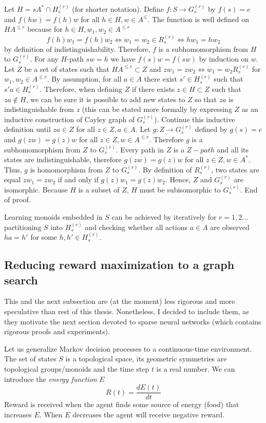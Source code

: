 \documentclass[12pt]{article}
\begin{document}
Let $H=sA^*\cap H_{s}^{(r)}$ (for shorter notation).
Define $f:S\rightarrow G_{s}^{(r)}$ by $f(s)=e$ and $f(hw)=f(h)w$ for all $h\in H ,w\in A^{\le}$.
The function is well defined on $HA^{\le r}$ because for $h\in H, w_1,w_2\in A^{\le r}$
\[
f(h)w_1=f(h)w_2 \iff w_1=w_2\in R_{s}^{(r)} \iff hw_1=hw_2 
\]
by definition of indistinguishability. Therefore, $f$ is a subhomomorphism from $H$ to $G_{s}^{(r)}$. For any $H$-path $sw=h$ we have $f(s)w=f(sw)$ by induction on $w$. Let $Z$ be a set of states such that $HA^{\le r}\subset Z$ and $zw_1=zw_2\iff w_1=w_2 R_{s}^{(r)}$ for $w_1,w_2\in A^{\le r}$. By assumption, for all $a\in A$  there exist $s'\in H_{s}^{(r)}$ such that $s'a\in H_{s}^{(r)}$. Therefore, when defining $Z$ if there exists $z\in H\subset Z$ such that $za\notin H$, we can be sure it is possible to add new states to $Z$ so that $za$ is indistinguishable from $z$ (this can be stated more formally by expressing $Z$ as an inductive construction of Cayley graph of $G_{s}^{(r)}$). Continue this inductive definition until $za\in Z$ for all $z\in Z,a\in A$. Let $g:Z\rightarrow G_{s}^{(r)}$ defined by $g(s)=e$ and $g(zw)=g(z)w$ for all $z\in Z,w\in A^{\le r}$. Therefore $g$ is a subhomomorphism from $Z$ to $G_{s}^{(r)}$. Every path in $Z$ is a $Z-path$ and all its states are indistinguishable, therefore $g(zw)=g(z)w$ for all $z\in Z,w\in A^*$. Thus, $g$ is homomorphism from $Z$ to $G_{s}^{(r)}$. By definition of $R_{s}^{(r)}$, two states are equal $zw_1=zw_2$ if and only if $g(z)w_1=g(z)w_2$. Hence, $Z$ and $G_{s}^{(r)}$ are isomorphic. Because $H$ is a subset of $Z$, $H$ must be subisomorphic to $G_{s}^{(r)}$. End of proof. 

Learning monoids embedded in $S$ can be achieved by iteratively for $r=1,2...$ partitioning $S$ into $H_{s}^{(r)}$ and checking whether all actions $a\in A$ are observed $ha=h'$ for some $h,h'\in H_{s}^{(r)}$.

\subsection{Reducing reward maximization to a graph search}

This and the next subsection are (at the moment) less rigorous and more speculative than rest of this thesis. Nonetheless, I decided to include them, as they motivate the next section devoted to sparse neural networks (which contains rigorous proofs and experiments). 

Let us generalize Markov decision processes to a continuous-time environment. The set of states $S$ is a topological space, its geometric symmetries are topological groups/monoids and the time step $t$ is a real number. We can introduce the \textit{energy function} $E$
\[
R(t) = \frac{dE(t)}{dt}
\]
Reward is received when the agent finds some source of energy (food) that increases $E$. When $E$ decreases the agent will receive negative reward. 
\end{document}
